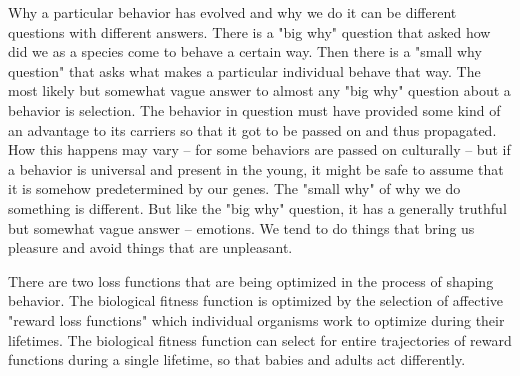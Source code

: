 Why a particular behavior has evolved and why we do it can be different questions with different answers. There is a "big why" question that asked how did we as a species come to behave a certain way. Then there is a "small why question" that asks what makes a particular individual behave that way. The most likely but somewhat vague answer to almost any "big why" question about a behavior is selection. The behavior in question must have provided some kind of an advantage to its carriers so that it got to be passed on and thus propagated. How this happens may vary -- for some behaviors are passed on culturally -- but if a behavior is universal and present in the young, it might be safe to assume that it is somehow predetermined by our genes. The "small why" of why we do something is different. But like the "big why" question, it has a generally truthful but somewhat vague answer -- emotions. We tend to do things that bring us pleasure and avoid things that are unpleasant.

There are two loss functions that are being optimized in the process of shaping behavior. The biological fitness function is optimized by the selection of affective "reward loss functions" which individual organisms work to optimize during their lifetimes. The biological fitness function can select for entire trajectories of reward functions during a single lifetime, so that babies and adults act differently.